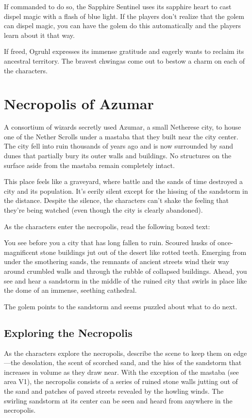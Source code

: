 \documentclass[10pt,a4paper,twoside,bg=print,twocolumn,openany,nodeprecatedcode]{dndbook}
\begin{document}
If commanded to do so, the Sapphire Sentinel uses its sapphire heart to cast dispel magic with a flash of blue light. If the players don't realize that the golem can dispel magic, you can have the golem do this automatically and the players learn about it that way.

If freed, Ogruhl expresses its immense gratitude and eagerly wants to reclaim its ancestral territory. The bravest chwingas come out to bestow a charm on each of the characters.

\section{Necropolis of Azumar}
A consortium of wizards secretly used Azumar, a small Netherese city, to house one of the Nether Scrolls under a mastaba that they built near the city center. The city fell into ruin thousands of years ago and is now surrounded by sand dunes that partially bury its outer walls and buildings. No structures on the surface aside from the mastaba remain completely intact.

This place feels like a graveyard, where battle and the sands of time destroyed a city and its population. It's eerily silent except for the hissing of the sandstorm in the distance. Despite the silence, the characters can't shake the feeling that they're being watched (even though the city is clearly abandoned).

As the characters enter the necropolis, read the following boxed text:

\begin{DndReadAloud}{}
You see before you a city that has long fallen to ruin. Scoured husks of once-magnificent stone buildings jut out of the desert like rotted teeth. Emerging from under the smothering sands, the remnants of ancient streets wind their way around crumbled walls and through the rubble of collapsed buildings. Ahead, you see and hear a sandstorm in the middle of the ruined city that swirls in place like the dome of an immense, seething cathedral.

\end{DndReadAloud}

The golem points to the sandstorm and seems puzzled about what to do next.

\subsection{Exploring the Necropolis}
As the characters explore the necropolis, describe the scene to keep them on edge—the desolation, the scent of scorched sand, and the hiss of the sandstorm that increases in volume as they draw near. With the exception of the mastaba (see area V1), the necropolis consists of a series of ruined stone walls jutting out of the sand and patches of paved streets revealed by the howling winds. The swirling sandstorm at its center can be seen and heard from anywhere in the necropolis.
\end{document}
